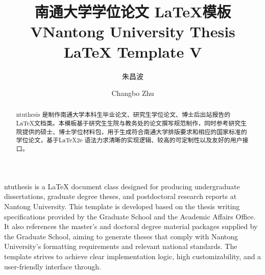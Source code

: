 \documentclass[doctor,academic]{style/ntuthesis}
\title{南通大学学位论文 \LaTeX{}模板 V\projectversion}%
\title*{Nantong University Thesis \LaTeX{} Template V\projectversion}%
\author{朱昌波}%
\author*{Changbo Zhu}%
\begin{document}
\maketitle%
\tableofcontents

\frontmatter%
\begin{abstract}    
ntuthesis 是制作南通大学本科生毕业论文、研究生学位论文、博士后出站报告的 \LaTeX{}文档类。本模板基于研究生生院与教务处的论文撰写规范制作，同时参考研究生院提供的硕士、博士学位材料包，用于生成符合南通大学排版要求和相应的国家标准的学位论文，基于\LaTeX{}2e 语法力求清晰的实现逻辑、较高的可定制性以及友好的用户接口。

\end{abstract}

\begin{abstract*}
ntuthesis is a \LaTeX{} document class designed for producing undergraduate dissertations, graduate degree theses, and postdoctoral research reports at Nantong University. This template is developed based on the thesis writing specifications provided by the Graduate School and the Academic Affairs Office. It also references the master's and doctoral degree material packages supplied by the Graduate School, aiming to generate theses that comply with Nantong University's formatting requirements and relevant national standards. The template strives to achieve clear implementation logic, high customizability, and a user-friendly interface through.

\end{abstract*}

\mainmatter









{
\intotoc*{\cleardoublepage}{\bibname}%
\linespread{1.25}
\ntuthesisbibliography%
}

\appendix





\cleardoublepage[plain]%
\end{document}
